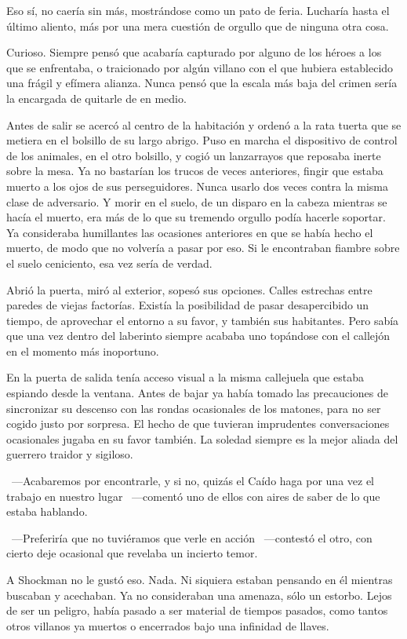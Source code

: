 Eso sí, no caería sin más, mostrándose como un pato de feria. Lucharía hasta el último aliento, más por una mera cuestión de orgullo que de ninguna otra cosa.

Curioso. Siempre pensó que acabaría capturado por alguno de los héroes a los que se enfrentaba, o traicionado por algún villano con el que hubiera establecido una frágil y efímera alianza. Nunca pensó que la escala más baja del crimen sería la encargada de quitarle de en medio.

Antes de salir se acercó al centro de la habitación y ordenó a la rata tuerta que se metiera en el bolsillo de su largo abrigo. Puso en marcha el dispositivo de control de los animales, en el otro bolsillo, y cogió un lanzarrayos que reposaba inerte sobre la mesa. Ya no bastarían los trucos de veces anteriores, fingir que estaba muerto a los ojos de sus perseguidores. Nunca usarlo dos veces contra la misma clase de adversario. Y morir en el suelo, de un disparo en la cabeza mientras se hacía el muerto, era más de lo que su tremendo orgullo podía hacerle soportar. Ya consideraba humillantes las ocasiones anteriores en que se había hecho el muerto, de modo que no volvería a pasar por eso. Si le encontraban fiambre sobre el suelo ceniciento, esa vez sería de verdad.

Abrió la puerta, miró al exterior, sopesó sus opciones. Calles estrechas entre paredes de viejas factorías. Existía la posibilidad de pasar desapercibido un tiempo, de aprovechar el entorno a su favor, y también sus habitantes. Pero sabía que una vez dentro del laberinto siempre acababa uno topándose con el callejón en el momento más inoportuno.

En la puerta de salida tenía acceso visual a la misma callejuela que estaba espiando desde la ventana. Antes de bajar ya había tomado las precauciones de sincronizar su descenso con las rondas ocasionales de los matones, para no ser cogido justo por sorpresa. El hecho de que tuvieran imprudentes conversaciones ocasionales jugaba en su favor también. La soledad siempre es la mejor aliada del guerrero traidor y sigiloso.

~---Acabaremos por encontrarle, y si no, quizás el Caído haga por una vez el trabajo en nuestro lugar ~---comentó uno de ellos con aires de saber de lo que estaba hablando.

~---Preferiría que no tuviéramos que verle en acción ~---contestó el otro, con cierto deje ocasional que revelaba un incierto temor.

A Shockman no le gustó eso. Nada. Ni siquiera estaban pensando en él mientras  buscaban y acechaban. Ya no  consideraban una amenaza, sólo un estorbo. Lejos de ser un peligro, había pasado a ser material de tiempos pasados, como tantos otros villanos ya muertos o encerrados bajo una infinidad de llaves.

